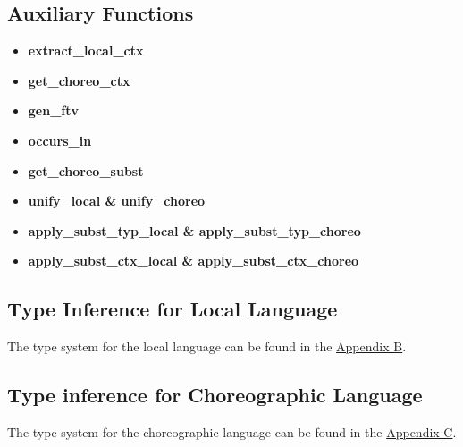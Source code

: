 \documentclass{article}
\begin{document}
\subsection{Auxiliary Functions}
    \begin{itemize}
        \item \textbf{extract\_local\_ctx}
        \item \textbf{get\_choreo\_ctx}
        \item \textbf{gen\_ftv}
        \item \textbf{occurs\_in}
        \item \textbf{get\_choreo\_subst}
        \item \textbf{unify\_local \& unify\_choreo}
        \item \textbf{apply\_subst\_typ\_local \& apply\_subst\_typ\_choreo}
        \item \textbf{apply\_subst\_ctx\_local \& apply\_subst\_ctx\_choreo}
    \end{itemize}

\subsection{Type Inference for Local Language}
    The type system for the local language can be found in the \hyperref[appendix:local_typ]{Appendix B}.

\subsection{Type inference for Choreographic Language}
    The type system for the choreographic language can be found in the \hyperref[appendix:choreo_typ]{Appendix C}.

    \newpage %
\end{document}

